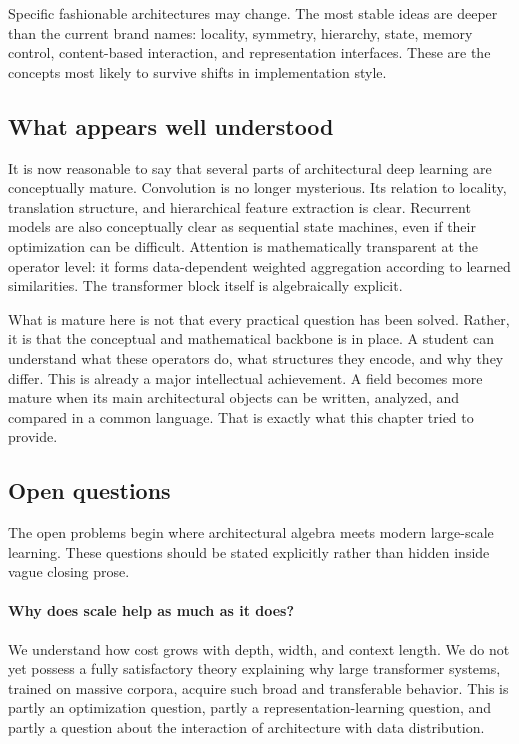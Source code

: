\begin{remark}
Specific fashionable architectures may change.
The most stable ideas are deeper than the current brand names:
locality, symmetry, hierarchy, state, memory control, content-based interaction, and representation interfaces.
These are the concepts most likely to survive shifts in implementation style.
\end{remark}

\subsection*{What appears well understood}

It is now reasonable to say that several parts of architectural deep learning are conceptually mature.
Convolution is no longer mysterious.
Its relation to locality, translation structure, and hierarchical feature extraction is clear.
Recurrent models are also conceptually clear as sequential state machines, even if their optimization can be difficult.
Attention is mathematically transparent at the operator level: it forms data-dependent weighted aggregation according to learned similarities.
The transformer block itself is algebraically explicit.

What is mature here is not that every practical question has been solved.
Rather, it is that the conceptual and mathematical backbone is in place.
A student can understand what these operators do, what structures they encode, and why they differ.
This is already a major intellectual achievement.
A field becomes more mature when its main architectural objects can be written, analyzed, and compared in a common language.
That is exactly what this chapter tried to provide.

\subsection*{Open questions}

The open problems begin where architectural algebra meets modern large-scale learning.
These questions should be stated explicitly rather than hidden inside vague closing prose.

\paragraph{Why does scale help as much as it does?}
We understand how cost grows with depth, width, and context length.
We do not yet possess a fully satisfactory theory explaining why large transformer systems, trained on massive corpora, acquire such broad and transferable behavior.
This is partly an optimization question, partly a representation-learning question, and partly a question about the interaction of architecture with data distribution.

